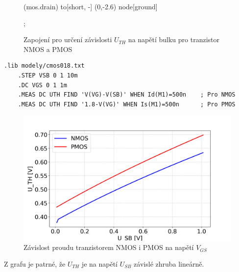 \begin{figure}[H]
\begin{minipage}{0.5\textwidth}
\begin{circuitikz}[scale=1, transform shape]
                (mos.drain) to[short, -] (0,-2.6) node[ground] {}

            ;
        \end{circuitikz}

        \vspace{5mm} 
    \end{minipage}
    \caption{\label{cod:cod_NP_WL_const} Zapojení pro určení závislosti \(U_{TH}\) na napětí bulku pro tranzistor NMOS a PMOS}
\end{figure}

\begin{lstlisting}[language=Spice, caption={Kod simulace pro určení závislosti \(U_{TH}\) na napětí bulku, pro NMOS}]
    .lib modely/cmos018.txt
    .STEP VSB 0 1 10m
    .DC VGS 0 1 1m
    .MEAS DC UTH FIND 'V(VG)-V(SB)' WHEN Id(M1)=500n    ; Pro NMOS
    .MEAS DC UTH FIND '1.8-V(VG)' WHEN Is(M1)=500n      ; Pro PMOS
\end{lstlisting}


\begin{figure}[h]
    \centering
    \includegraphics[height=0.3\textheight]{text/img/NP-bulkEfekt.png}
    \caption{\label{fig:graf_NP_KP} Závislost proudu tranzistorem NMOS i PMOS na napětí \(V_{GS}\)}
\end{figure}

Z grafu je patrné, že \(U_{TH}\) je na napětí \(U_{SB}\) závislé zhruba lineárně.


